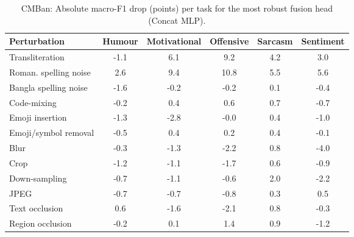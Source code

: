 \begin{table}[t]
\centering
\small
\caption{CMBan: Absolute macro-F1 drop (points) per task for the most robust fusion head (Concat MLP).}
\label{tab:rob_task_fine_cmban}
\begin{adjustbox}{max width=\columnwidth}
\begin{tabular}{lccccc}
\toprule
Perturbation & Humour & Motivational & Offensive & Sarcasm & Sentiment \\
\midrule
Transliteration & -1.1 & 6.1 & 9.2 & 4.2 & 3.0 \\
Roman. spelling noise & 2.6 & 9.4 & 10.8 & 5.5 & 5.6 \\
Bangla spelling noise & -1.6 & -0.2 & -0.2 & 0.1 & -0.4 \\
Code-mixing & -0.2 & 0.4 & 0.6 & 0.7 & -0.7 \\
Emoji insertion & -1.3 & -2.8 & -0.0 & 0.4 & -1.0 \\
Emoji/symbol removal & -0.5 & 0.4 & 0.2 & 0.4 & -0.1 \\
Blur & -0.3 & -1.3 & -2.2 & 0.8 & -4.0 \\
Crop & -1.2 & -1.1 & -1.7 & 0.6 & -0.9 \\
Down-sampling & -0.7 & -1.1 & -0.6 & 2.0 & -2.2 \\
JPEG & -0.7 & -0.7 & -0.8 & 0.3 & 0.5 \\
Text occlusion & 0.6 & -1.6 & -2.1 & 0.8 & -0.3 \\
Region occlusion & -0.2 & 0.1 & 1.4 & 0.9 & -1.2 \\
\bottomrule
\end{tabular}
\end{adjustbox}
\end{table}
